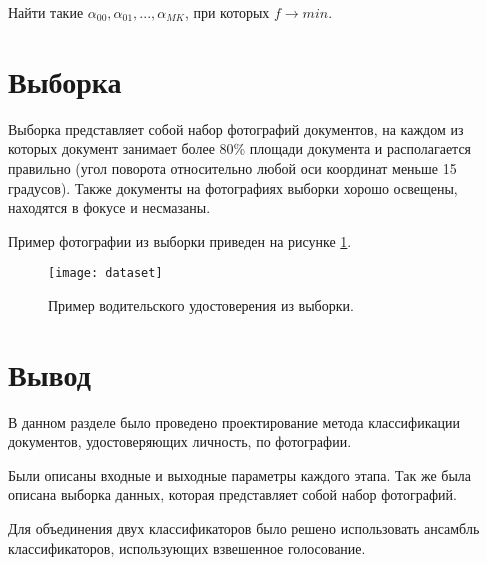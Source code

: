 Найти такие $\alpha_{00}, \alpha_{01}, ..., \alpha_{MK}$, при которых $f \rightarrow min$.

\section{Выборка}

Выборка представляет собой набор фотографий документов, на каждом из которых документ занимает более 80\% площади документа и располагается правильно (угол поворота относительно любой оси координат меньше 15 градусов). Также документы на фотографиях выборки хорошо освещены, находятся в фокусе и несмазаны.

Пример фотографии из выборки приведен на рисунке \ref{img:dataset}.

\begin{figure}[H]
	\centering
	\texttt{[image: dataset]}
	\caption{Пример водительского удостоверения из выборки. }
	\label{img:dataset}
\end{figure}

\section{Вывод}

В данном разделе было проведено проектирование метода классификации документов, удостоверяющих личность, по фотографии.

Были описаны входные и выходные параметры каждого этапа. Так же была описана выборка данных, которая представляет собой набор фотографий. 

Для объединения двух классификаторов было решено использовать ансамбль классификаторов, использующих взвешенное голосование.
